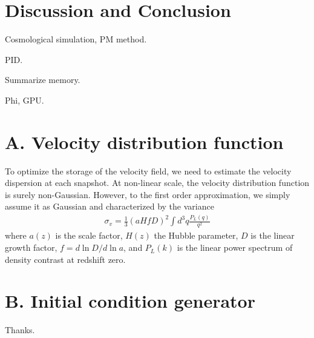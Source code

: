 \documentclass[10pt,twocolumn,preprint]{emulateapj}
\begin{document}
\section{Discussion and Conclusion}
Cosmological simulation, PM method.

PID.

Summarize memory.

Phi, GPU.


\clearpage

\appendix
\section{A. Velocity distribution function}
To optimize the storage of the velocity field, we need to estimate the velocity dispersion at each snapshot. At non-linear scale, the velocity distribution function is surely non-Gaussian. However, to the first order approximation, we simply assume it as Gaussian and characterized by the variance
\begin{eqnarray}
\sigma_v = \frac{1}{3}  (a H f D)^2 \int d^3q \frac{P_{L}(q)}{q^2} 
\end{eqnarray}
where $a(z)$ is the scale factor, $H(z)$ the Hubble parameter, $D$ is the linear growth factor, $f=d \ln D/d\ln a$, 
and $P_L(k)$ is the linear power spectrum of density contrast at redshift zero. 

 

\section{B. Initial condition generator}


\acknowledgements
Thanks.



\end{document}
